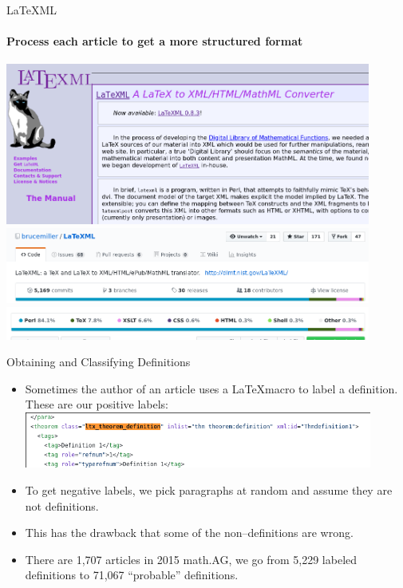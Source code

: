 \documentclass[10pt]{beamer}
\begin{document}
\begin{frame}{LaTeXML}
    \framesubtitle{Process each article to get a more structured format}
    \includegraphics[width=0.9\textwidth]{ltxml_website.png}
    \includegraphics[width=0.9\textwidth]{ltxml_github1.png}
    \includegraphics[width=0.9\textwidth]{ltxml_github2.png}
\end{frame}

\begin{frame}{Obtaining and Classifying Definitions}
    \begin{itemize}
            \item Sometimes the author of an article uses a \LaTeX macro to label a definition. These are our positive labels:
    \includegraphics[width=0.9\textwidth]{ltxml_defin_xml.png}
    \item To get negative labels, we pick paragraphs at random and assume they are not definitions.
        \item This has the drawback that some of the non--definitions are wrong.
    \item There are 1,707 articles in 2015 math.AG, we go from 5,229 labeled definitions to 71,067 ``probable'' definitions.  \end{itemize}
\end{frame}
\end{document}
